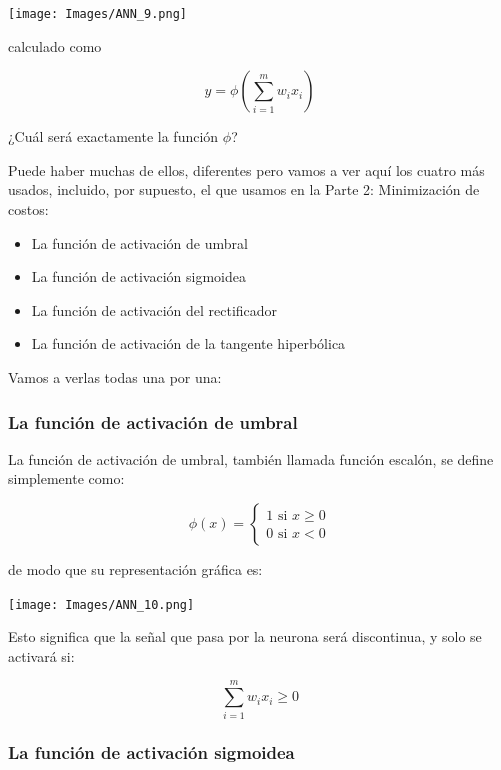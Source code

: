 \documentclass[
]{book}
\providecommand{\tightlist}{%
  \setlength{\itemsep}{0pt}\setlength{\parskip}{0pt}}
\begin{document}
\texttt{[image: Images/ANN\_9.png]}

calculado como

\[y = \phi\left( \sum_{i=1}^m w_i x_i \right)\]

¿Cuál será exactamente la función \(\phi\)?

Puede haber muchas de ellos, diferentes pero vamos a ver aquí los cuatro más usados, incluido, por supuesto, el que usamos en la Parte 2: Minimización de costos:

\begin{itemize}
\tightlist
\item
  La función de activación de umbral
\item
  La función de activación sigmoidea
\item
  La función de activación del rectificador
\item
  La función de activación de la tangente hiperbólica
\end{itemize}

Vamos a verlas todas una por una:

\hypertarget{la-funciuxf3n-de-activaciuxf3n-de-umbral}{%
\subsubsection{La función de activación de umbral}\label{la-funciuxf3n-de-activaciuxf3n-de-umbral}}

La función de activación de umbral, también llamada función escalón, se define simplemente como:

\[
\phi(x) =
    \begin{cases}
        1 \textrm{ si } x \ge 0 \\
        0 \textrm{ si } x < 0
    \end{cases}
\]

de modo que su representación gráfica es:

\texttt{[image: Images/ANN\_10.png]}

Esto significa que la señal que pasa por la neurona será discontinua, y solo se activará si:

\[\sum_{i=1}^m w_i x_i \ge 0\]

\hypertarget{la-funciuxf3n-de-activaciuxf3n-sigmoidea}{%
\subsubsection{La función de activación sigmoidea}\label{la-funciuxf3n-de-activaciuxf3n-sigmoidea}}
\end{document}
